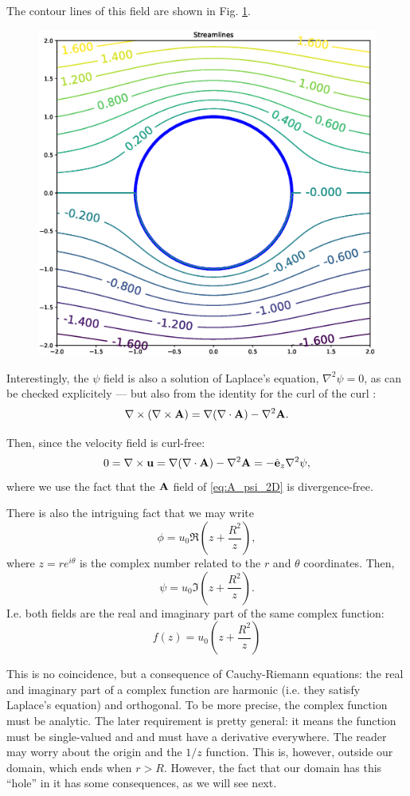 The contour lines of this field are shown in
Fig. \ref{fig:potential_flow_past_cylinder}.

\begin{figure}
  \centering
  \includegraphics[width=0.4\linewidth]{figures/potential_flow_past_cylinder}
  \caption{\label{fig:potential_flow_past_cylinder}}
\end{figure}

Interestingly, the $\psi$ field is also a solution of Laplace's
equation, $\nabla^2 \psi=0$, as can be checked explicitely --- but
also from the identity for the curl of the curl
\cite{wiki:Vector_calculus_identities}:
\begin{equation}
  \label{eq:curl_of_curl}
  \nabla \times \left(\nabla \times \mathbf{A} \right)=
  \nabla (\nabla \cdot \mathbf {A} )-\nabla^2\mathbf{A} .
\end{equation}

Then, since the velocity field is curl-free:
\begin{equation}
  \label{eq:if_no_curl_then_stream_harmonic}
  0 = \nabla \times \mathbf{u} =
  \nabla (\nabla \cdot \mathbf {A} )- \nabla^{2}\mathbf {A} =
  - \hat{\mathbf{e}}_z \nabla^{2} \psi,
\end{equation}
where we use the fact that the $\mathbf{A}$ field of \ref{eq:A_psi_2D} is
divergence-free.


There is also the intriguing fact that we may write
\[
\phi = u_0 \Re \left( z  + \frac{R^2}{z} \right) ,
\]
where $z=r e^{i\theta}$ is the complex number related to the $r$ and
$\theta$ coordinates. Then,
\[
\psi = u_0 \Im \left( z  + \frac{R^2}{z} \right) .
\]
%
I.e. both fields are the real and imaginary part of the same complex
function:
\[
f(z) = u_0 \left( z  + \frac{R^2}{z} \right)
\]

This is no coincidence, but a consequence of Cauchy-Riemann
equations: the real and imaginary part of a complex function are
harmonic (i.e. they satisfy Laplace's equation) and orthogonal. To be
more precise, the complex function must be analytic. The later
requirement is pretty general: it means the function must be
single-valued and and must have a derivative everywhere. The reader
may worry about the origin and the $1/z$ function. This is, however,
outside our domain, which ends when $r>R$. However, the fact that our
domain has this ``hole'' in it has some consequences, as we will see
next.


